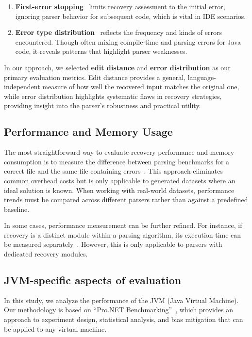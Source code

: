 \documentclass[conference]{IEEEtran}
\begin{document}
\begin{enumerate}
    \item \textbf{First-error stopping}~\cite{first-errors, error-frequence} limits recovery assessment to the initial error, ignoring parser behavior for subsequent code, which is vital in IDE scenarios.

    \item \textbf{Error type distribution}~\cite{error-frequence} reflects the frequency and kinds of errors encountered. Though often mixing compile-time and parsing errors for Java code, it reveals patterns that highlight parser weaknesses.
\end{enumerate}

In our approach, we selected \textbf{edit distance} and \textbf{error distribution} as our primary evaluation metrics.  Edit distance provides a general, language-independent measure of how well the recovered input matches the original one, while error distribution highlights systematic flaws in recovery strategies, providing insight into the parser’s robustness and practical utility.


\subsection{Performance and Memory Usage }
The most straightforward way to evaluate recovery performance and memory consumption is to measure the difference between parsing benchmarks for a correct file and the same file containing errors~\cite{natural_recovery, fuzz_recovery}. This approach eliminates common overhead costs but is only applicable to generated datasets where an ideal solution is known.  When working with real-world datasets, performance trends must be compared across different parsers rather than against a predefined baseline.

In some cases, performance measurement can be  further refined. For instance, if recovery is a distinct module  within a parsing algorithm, its execution time can be measured separately~\cite{panic}. However, this is only applicable to parsers with dedicated recovery modules.

\subsection{JVM-specific aspects of evaluation}
In this study, we analyze the performance of the JVM (Java Virtual Machine). Our methodology is based on ``Pro.NET Benchmarking''~\cite{bench}, which provides an approach to experiment design, statistical analysis, and bias mitigation that can be applied to any virtual machine.
\end{document}
